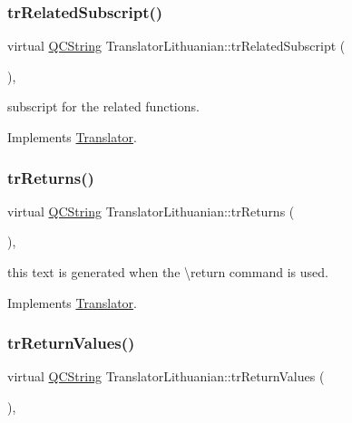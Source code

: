 \subsubsection{\texorpdfstring{trRelatedSubscript()}{trRelatedSubscript()}}
{\footnotesize\ttfamily virtual \mbox{\hyperlink{class_q_c_string}{Q\+C\+String}} Translator\+Lithuanian\+::tr\+Related\+Subscript (\begin{DoxyParamCaption}{ }\end{DoxyParamCaption})\hspace{0.3cm}{\ttfamily [inline]}, {\ttfamily [virtual]}}

subscript for the related functions. 

Implements \mbox{\hyperlink{class_translator}{Translator}}.

\mbox{\label{class_translator_lithuanian_a6564cd68c451dd9224fbbc31b53e771c}} 
\subsubsection{\texorpdfstring{trReturns()}{trReturns()}}
{\footnotesize\ttfamily virtual \mbox{\hyperlink{class_q_c_string}{Q\+C\+String}} Translator\+Lithuanian\+::tr\+Returns (\begin{DoxyParamCaption}{ }\end{DoxyParamCaption})\hspace{0.3cm}{\ttfamily [inline]}, {\ttfamily [virtual]}}

this text is generated when the \textbackslash{}return command is used. 

Implements \mbox{\hyperlink{class_translator}{Translator}}.

\mbox{\label{class_translator_lithuanian_a1fcad349b618d05e12e1d766aceea8ac}} 
\subsubsection{\texorpdfstring{trReturnValues()}{trReturnValues()}}
{\footnotesize\ttfamily virtual \mbox{\hyperlink{class_q_c_string}{Q\+C\+String}} Translator\+Lithuanian\+::tr\+Return\+Values (\begin{DoxyParamCaption}{ }\end{DoxyParamCaption})\hspace{0.3cm}{\ttfamily [inline]}, {\ttfamily [virtual]}}

